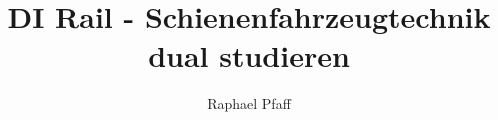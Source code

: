 \documentclass[slidestop,compress,mathserif, aspectratio = 169]{beamer}
\begin{document}
\newcommand{\source}[1]{\rotatebox{90}{\tiny \color{gray} #1}}

\newcommand{\done}{${\color{teal}\checkmark}$}

\title{DI Rail - Schienenfahrzeugtechnik dual studieren}
\author{Raphael Pfaff}



%
%
%
\end{document}
